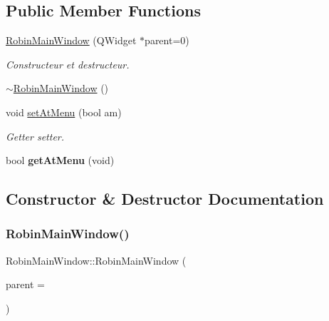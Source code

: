 \subsection*{Public Member Functions}
\begin{DoxyCompactItemize}
\item 
\hyperlink{class_robin_main_window_a55f7775f5daefb2099a51e97d50df666}{Robin\+Main\+Window} (Q\+Widget $\ast$parent=0)
\begin{DoxyCompactList}\small\item\em Constructeur et destructeur. \end{DoxyCompactList}\item 
\hyperlink{class_robin_main_window_a72eb8450efc1dfe22e2f36c7f728c5f3}{$\sim$\+Robin\+Main\+Window} ()
\item 
\mbox{\label{class_robin_main_window_a66991c9057efd1d3ebc38e57e8df5b72}} 
void \hyperlink{class_robin_main_window_a66991c9057efd1d3ebc38e57e8df5b72}{set\+At\+Menu} (bool am)
\begin{DoxyCompactList}\small\item\em Getter setter. \end{DoxyCompactList}\item 
\mbox{\label{class_robin_main_window_a8d360dc6f209df2b1567f8c787dd49c7}} 
bool {\bfseries get\+At\+Menu} (void)
\end{DoxyCompactItemize}


\subsection{Constructor \& Destructor Documentation}
\mbox{\label{class_robin_main_window_a55f7775f5daefb2099a51e97d50df666}} 
\subsubsection{\texorpdfstring{Robin\+Main\+Window()}{RobinMainWindow()}}
{\footnotesize\ttfamily Robin\+Main\+Window\+::\+Robin\+Main\+Window (\begin{DoxyParamCaption}\item[{Q\+Widget $\ast$}]{parent = {} }\end{DoxyParamCaption})\hspace{0.3cm}{\ttfamily [explicit]}}



